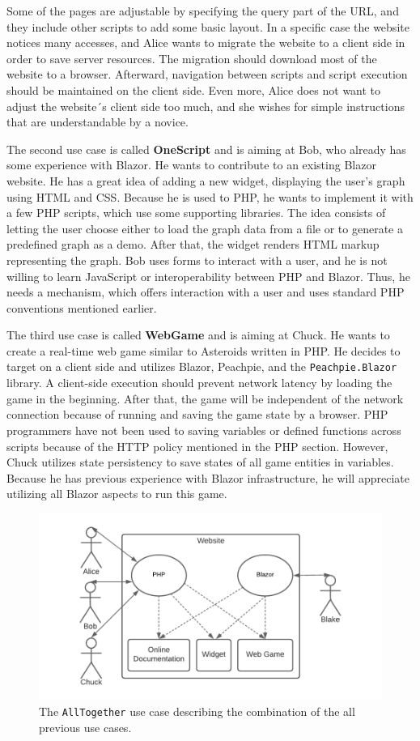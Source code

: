 Some of the pages are adjustable by specifying the query part of the URL, and they include other scripts to add some basic layout.
In a specific case the website notices many accesses, and Alice wants to migrate the website to a client side in order to save server resources.
The migration should download most of the website to a browser.
Afterward, navigation between scripts and script execution should be maintained on the client side.
Even more, Alice does not want to adjust the website´s client side too much, and she wishes for simple instructions that are understandable by a novice.
\par
The second use case is called \textbf{OneScript} and is aiming at Bob, who already has some experience with Blazor.
He wants to contribute to an existing Blazor website.
He has a great idea of adding a new widget, displaying the user's graph using HTML and CSS.
Because he is used to PHP, he wants to implement it with a few PHP scripts, which use some supporting libraries.
The idea consists of letting the user choose either to load the graph data from a file or to generate a predefined graph as a demo.
After that, the widget renders HTML markup representing the graph.
Bob uses forms to interact with a user, and he is not willing to learn JavaScript or interoperability between PHP and Blazor.
Thus, he needs a mechanism, which offers interaction with a user and uses standard PHP conventions mentioned earlier.
\par
The third use case is called \textbf{WebGame} and is aiming at Chuck.
He wants to create a real-time web game similar to Asteroids written in PHP.
He decides to target on a client side and utilizes Blazor, Peachpie, and the \texttt{Peachpie.Blazor} library.
A client-side execution should prevent network latency by loading the game in the beginning.
After that, the game will be independent of the network connection because of running and saving the game state by a browser.
PHP programmers have not been used to saving variables or defined functions across scripts because of the HTTP policy mentioned in the PHP section.
However, Chuck utilizes state persistency to save states of all game entities in variables.
Because he has previous experience with Blazor infrastructure, he will appreciate utilizing all Blazor aspects to run this game.
\par
\begin{figure}
\centering
\includegraphics[scale=0.8]{./img/UseCaseAllTogether}
\caption{The \texttt{AllTogether} use case describing the combination of the all previous use cases. }
\label{img09:usecase}
\end{figure} 
